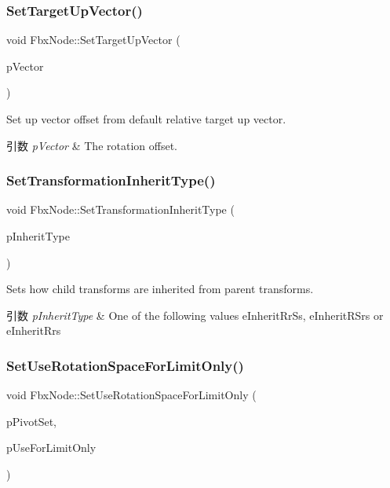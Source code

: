\subsubsection{\texorpdfstring{Set\+Target\+Up\+Vector()}{SetTargetUpVector()}}
{\footnotesize\ttfamily void Fbx\+Node\+::\+Set\+Target\+Up\+Vector (\begin{DoxyParamCaption}\item[{\hyperlink{class_fbx_vector4}{Fbx\+Vector4}}]{p\+Vector }\end{DoxyParamCaption})}

Set up vector offset from default relative target up vector. 
\begin{DoxyParams}{引数}
{\em p\+Vector} & The rotation offset. \\
\hline
\end{DoxyParams}
\mbox{\label{class_fbx_node_a98be0727d8a7a17bb163fa8ee3c5909f}} 
\subsubsection{\texorpdfstring{Set\+Transformation\+Inherit\+Type()}{SetTransformationInheritType()}}
{\footnotesize\ttfamily void Fbx\+Node\+::\+Set\+Transformation\+Inherit\+Type (\begin{DoxyParamCaption}\item[{\hyperlink{class_fbx_transform_ac1ab8f75b4873723daa68c57f999b10f}{Fbx\+Transform\+::\+E\+Inherit\+Type}}]{p\+Inherit\+Type }\end{DoxyParamCaption})}

Sets how child transforms are inherited from parent transforms. 
\begin{DoxyParams}{引数}
{\em p\+Inherit\+Type} & One of the following values e\+Inherit\+Rr\+Ss, e\+Inherit\+R\+Srs or e\+Inherit\+Rrs \\
\hline
\end{DoxyParams}
\mbox{\label{class_fbx_node_a34289245325b1dec86bb441e429706d0}} 
\subsubsection{\texorpdfstring{Set\+Use\+Rotation\+Space\+For\+Limit\+Only()}{SetUseRotationSpaceForLimitOnly()}}
{\footnotesize\ttfamily void Fbx\+Node\+::\+Set\+Use\+Rotation\+Space\+For\+Limit\+Only (\begin{DoxyParamCaption}\item[{\hyperlink{class_fbx_node_ae62b7311ac4727654cdf1ebd5cbf7343}{E\+Pivot\+Set}}]{p\+Pivot\+Set,  }\item[{bool}]{p\+Use\+For\+Limit\+Only }\end{DoxyParamCaption})}

